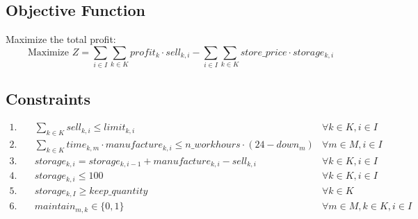 \documentclass{article}
\begin{document}
\subsection*{Objective Function}
Maximize the total profit:
\[
\text{Maximize } Z = \sum_{i \in I} \sum_{k \in K} profit_k \cdot sell_{k,i} - \sum_{i \in I} \sum_{k \in K} store\_price \cdot storage_{k,i}
\]

\subsection*{Constraints}
\begin{align*}
1. & \quad \sum_{k \in K} sell_{k,i} \leq limit_{k,i} & \forall k \in K, i \in I \\
2. & \quad \sum_{k \in K} time_{k,m} \cdot manufacture_{k,i} \leq n\_workhours \cdot (24 - down_m) & \forall m \in M, i \in I \\
3. & \quad storage_{k,i} = storage_{k,i-1} + manufacture_{k,i} - sell_{k,i} & \forall k \in K, i \in I \\
4. & \quad storage_{k,i} \leq 100 & \forall k \in K, i \in I \\
5. & \quad storage_{k,I} \geq keep\_quantity & \forall k \in K \\
6. & \quad maintain_{m,k} \in \{0, 1\} & \forall m \in M, k \in K, i \in I
\end{align*}
\end{document}
